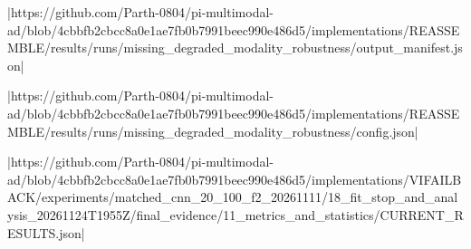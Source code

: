 |https://github.com/Parth-0804/pi-multimodal-ad/blob/4cbbfb2cbcc8a0e1ae7fb0b7991beec990e486d5/implementations/REASSEMBLE/results/runs/missing_degraded_modality_robustness/output_manifest.json|

|https://github.com/Parth-0804/pi-multimodal-ad/blob/4cbbfb2cbcc8a0e1ae7fb0b7991beec990e486d5/implementations/REASSEMBLE/results/runs/missing_degraded_modality_robustness/config.json|

|https://github.com/Parth-0804/pi-multimodal-ad/blob/4cbbfb2cbcc8a0e1ae7fb0b7991beec990e486d5/implementations/VIFAILBACK/experiments/matched_cnn_20_100_f2_20261111/18_fit_stop_and_analysis_20261124T1955Z/final_evidence/11_metrics_and_statistics/CURRENT_RESULTS.json|

